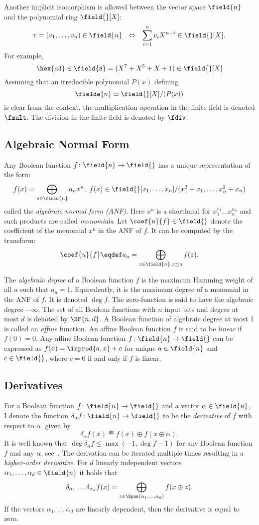 Another implicit isomorphism is allowed between the vector space $\field{n}$ and the polynomial ring $\field{}[X]$:
$$
v = (v_1, \ldots, v_n) \in \field{n}
~~\Leftrightarrow~~
\sum_{i=1}^n v_i X^{n-i} \in \field{}[X].
$$
For example,
$$
\hex{a3} \in \field{8} = (X^7 + X^5 + X + 1) \in \field{}[X]
$$
Assuming that an irreducible polynomial $P(x)$ defining
$$
\fielde{n} \simeq \field{}[X]/(P(x))
$$
is clear from the context, the multiplication operation in the finite field is denoted $\fmult$. The division in the finite field is denoted by $\fdiv$. 


\subsection{Algebraic Normal Form}
Any Boolean function $f\colon \field{n} \to \field{}$ has a unique representation of the form
$$
f(x) = \bigoplus_{u \in \field{n}} a_u x^u,~
f(x) \in \field{}[x_1,\ldots,x_n]/(x_1^2 + x_1, \ldots, x_n^2 + x_n)
$$
called the \emph{algebraic normal form (ANF)}. Here $x^u$ is a shorthand for $x_1^{u_1}\ldots x_n^{u_n}$ and such products are called \emph{monomials}. Let $\coef{u}{f}\in \field{}$ denote the coefficient of the monomial $x^u$ in the ANF of $f$. It can be computed by the \Mobius{} transform:
$$
\coef{u}{f} \eqdef a_u = \bigoplus_{z \in \field{n}, z \preceq u} f(z).
$$

The \emph{algebraic degree} of a Boolean function $f$ is the maximum Hamming weight of all $u$ such that $a_u=1$. Equivalently, it is the maximum degree of a monomial in the ANF of $f$.  It is denoted $\deg{f}$. The zero-function is said to have the algebraic degree $-\infty$. The set of all Boolean functions with $n$ input bits and degree at most $d$ is denoted by $\BF{n,d}$. A Boolean function of algebraic degree at most 1 is called an \emph{affine} function. An affine Boolean function $f$ is said to be \emph{linear} if $f(0) = 0$. Any affine Boolean function $f\colon \field{n} \to \field{}$ can be expressed as $f(x) = \inprod{a,x} + c$ for unique $a\in \field{n}$ and $c \in \field{}$, where $c = 0$ if and only if $f$ is linear.


\subsection{Derivatives}
For a Boolean function $f\colon \field{n} \to \field{}$ and a vector $\alpha \in \field{n}$, I denote the function $\delta_\alpha f\colon \field{n} \to \field{}$ to be the \emph{derivative} of $f$ with respect to $\alpha$, given by
$$
\delta_\alpha f(x) \eqdef f(x) \oplus f(x\oplus \alpha).
$$
It is well known that $\deg{\delta_\alpha f} \le \max(-1, \deg{f} - 1)$ for any Boolean function $f$ and any $\alpha$, see~\cite{Lai1994}. The derivation can be iterated multiple times resulting in a \emph{higher-order derivative}. For $d$ linearly independent vectors $\alpha_1, \ldots, \alpha_{d} \in \field{n}$ it holds that
$$
\delta_{\alpha_1}\ldots \delta_{\alpha_{d}}f(x) = \bigoplus_{z \in \Span(\alpha_1, \ldots, \alpha_{d})} f(x \oplus z).
$$
If the vectors $\alpha_1, \ldots, \alpha_{d}$ are linearly dependent, then the derivative is equal to zero.


